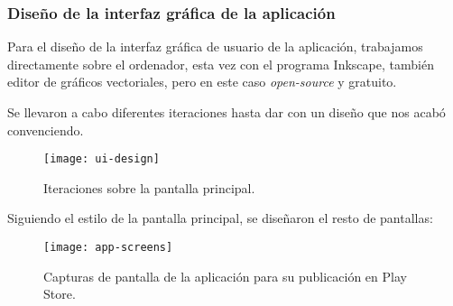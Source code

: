 \newpage

\subsubsection{Diseño de la interfaz gráfica de la aplicación}

Para el diseño de la interfaz gráfica de usuario de la aplicación, trabajamos directamente sobre el ordenador, esta vez con el programa Inkscape, también editor de gráficos vectoriales, pero en este caso \emph{open-source} y gratuito.

Se llevaron a cabo diferentes iteraciones hasta dar con un diseño que nos acabó convenciendo.

\begin{figure}[h!]
	\centering
	\texttt{[image: ui-design]}
	\vspace{-0.5cm}
	\caption{Iteraciones sobre la pantalla principal.}
\end{figure}

Siguiendo el estilo de la pantalla principal, se diseñaron el resto de pantallas:

\begin{figure}[h!]
	\centering
	\texttt{[image: app-screens]}
	\vspace{-0.5cm}
	\caption{Capturas de pantalla de la aplicación para su publicación en Play Store.}
\end{figure}
